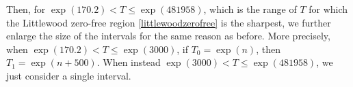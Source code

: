 \documentclass[reqno]{amsart}
\numberwithin{equation}{section}
\theoremstyle{remark}
\begin{document}
Then, for $\exp(170.2)<T\le \exp(481958)$, which is the range of $T$ for which the Littlewood zero-free region \eqref{littlewoodzerofree} is the sharpest, we further enlarge the size of the intervals for the same reason as before. More precisely, when $\exp(170.2)<T\le \exp(3000)$, if $T_0=\exp(n)$, then $T_1=\exp(n+500)$. When instead $\exp(3000)<T\le \exp(481958)$, we just consider a single interval. 

\end{document}
